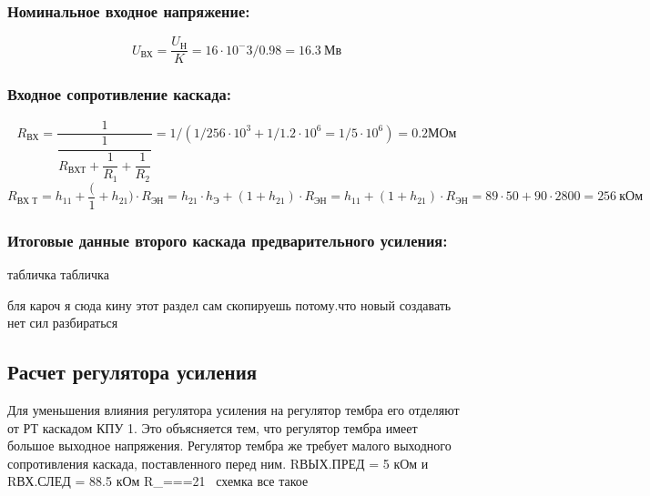 \subsubsection{Номинальное входное напряжение:}
\begin{equation}
   \label{eq:equation6_20}
U_{\text{ВХ}}=\dfrac {U_{\text{Н}}}{K}=16 \cdot 10^-3 /0.98= 16.3~\text {Мв}
\end{equation}
\subsubsection{Входное сопротивление каскада:}
\begin{equation}
   \label{eq:equation6_21}
R_{\text{ВХ}}=\dfrac{1}{\dfrac{1}{R_{ВХ Т}+\dfrac{1}{R_1}+\dfrac{1}{R_2}}}=1/(1/256 \cdot 10^3 +1/1.2 \cdot 10^6 =1/5 \cdot 10^6)=0.2\text{МОм}
\end{equation}
\begin{equation}
   \label{eq:equation6_22}
R_{\text{ВХ Т}}=h_11+\dfrac(1+h_21)\cdot R_{\text{ЭН}}=h_21 \cdot h_{\text{Э}}+(1+h_21) \cdot R_{\text{ЭН}}=h_11+(1+h_21) \cdot R_{\text{ЭН}}=89 \cdot 50+90 \cdot 2800 =256~\text{кОм}
\end{equation}
\subsubsection{Итоговые данные второго каскада предварительного усиления:}
табличка
табличка




бля кароч я сюда кину этот раздел сам скопируешь потому.что новый создавать нет сил разбираться
\subsection{Расчет регулятора усиления}

     Для уменьшения влияния регулятора усиления на регулятор тембра его отделяют от РТ каскадом КПУ 1. Это объясняется тем, что регулятор тембра имеет большое выходное напряжения. Регулятор тембра же требует малого выходного сопротивления каскада, поставленного перед ним.
     RВЫХ.ПРЕД = 5 кОм  и   RВХ.СЛЕД = 88.5 кОм  
     R_{}===21~
     схемка все такое